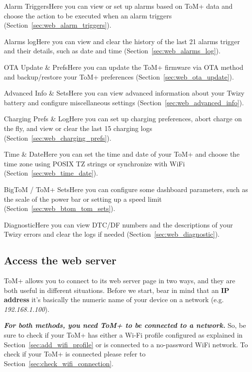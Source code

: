 {Alarm Triggers}{Here you can view or set up alarms based on ToM+ data and choose the action to be executed when an alarm triggers (Section~\ref{sec:web_alarm_triggers}).}

{Alarms log}{Here you can view and clear the history of the last 21 alarms trigger and their details, such as date and time (Section~\ref{sec:web_alarms_log}).}

{OTA Update \& Prefs}{Here you can update the ToM+ firmware via OTA method and backup/restore your ToM+ preferences (Section~\ref{sec:web_ota_update}).}

{Advanced Info \& Sets}{Here you can view advanced information about your Twizy battery and configure miscellaneous settings (Section~\ref{sec:web_advanced_info}).}

{Charging Prefs \& Log}{Here you can set up charging preferences, abort charge on the fly, and view or clear the last 15 charging logs (Section~\ref{sec:web_charging_prefs}).}

{Time \& Date}{Here you can set the time and date of your ToM+ and choose the time zone using POSIX TZ strings or synchronize with WiFi (Section~\ref{sec:web_time_date}).}

{BigToM / ToM+ Sets}{Here you can configure some dashboard parameters, such as the scale of the power bar or setting up a speed limit (Section~\ref{sec:web_btom_tom_sets}).}

{Diagnostic}{Here you can view DTC/DF numbers and the descriptions of your Twizy errors and clear the logs if needed (Section~\ref{sec:web_diagnostic}).}


\subsection{Access the web server}
\label{sec:web_server_access}

ToM+ allows you to connect to its web server page in two ways, and they are both
useful in different situations. Before we start, bear in mind that an \textbf{IP address}
it's basically the numeric name of your device on a network (e.g. \textit{192.168.1.100}).

\textbf{\textit{For both methods, you need ToM+ to be connected to a network.}}
So, be sure to check if your ToM+ has either a Wi-Fi profile configured as
explained in Section~\ref{sec:add_wifi_profile} or is connected to a no-password WiFi network.
To check if your ToM+ is connected please refer to Section~\ref{sec:check_wifi_connection}.\\

